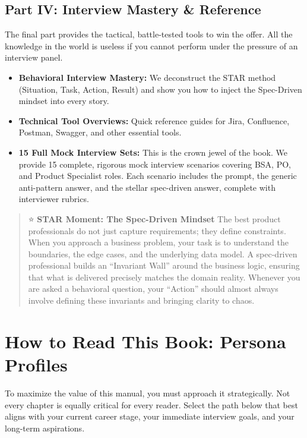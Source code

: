 \subsection{Part IV: Interview Mastery \&
Reference}\label{part-iv-interview-mastery-reference}

The final part provides the tactical, battle-tested tools to win the
offer. All the knowledge in the world is useless if you cannot perform
under the pressure of an interview panel.

\begin{itemize}
\tightlist
\item
  \textbf{Behavioral Interview Mastery:} We deconstruct the STAR method
  (Situation, Task, Action, Result) and show you how to inject the
  Spec-Driven mindset into every story.
\item
  \textbf{Technical Tool Overviews:} Quick reference guides for Jira,
  Confluence, Postman, Swagger, and other essential tools.
\item
  \textbf{15 Full Mock Interview Sets:} This is the crown jewel of the
  book. We provide 15 complete, rigorous mock interview scenarios
  covering BSA, PO, and Product Specialist roles. Each scenario includes
  the prompt, the generic anti-pattern answer, and the stellar
  spec-driven answer, complete with interviewer rubrics.
\end{itemize}

\begin{quote}
⭐ \textbf{STAR Moment: The Spec-Driven Mindset} The best product
professionals do not just capture requirements; they define constraints.
When you approach a business problem, your task is to understand the
boundaries, the edge cases, and the underlying data model. A spec-driven
professional builds an ``Invariant Wall'' around the business logic,
ensuring that what is delivered precisely matches the domain reality.
Whenever you are asked a behavioral question, your ``Action'' should
almost always involve defining these invariants and bringing clarity to
chaos.
\end{quote}

\section{How to Read This Book: Persona
Profiles}\label{how-to-read-this-book-persona-profiles}

To maximize the value of this manual, you must approach it
strategically. Not every chapter is equally critical for every reader.
Select the path below that best aligns with your current career stage,
your immediate interview goals, and your long-term aspirations.

